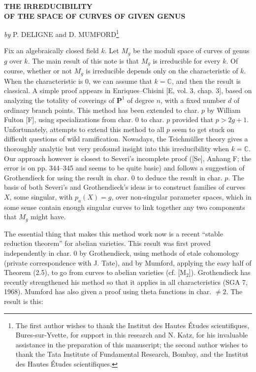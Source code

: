 \documentclass[10pt]{article}
\newcommand{\pa}{p_a}
\newcommand{\PP}{\mathbf P}
\begin{document}
\begin{center}
{\Large\bfseries THE IRREDUCIBILITY\\[0.3em]
OF THE SPACE OF CURVES OF GIVEN GENUS}\par
\vspace{0.8em}
{\itshape by} P. DELIGNE and D. MUMFORD\footnote{The first author wishes to thank the Institut des Hautes Études scientifiques, Bures-sur-Yvette, for support in this research and N. Katz, for his invaluable assistance in the preparation of this manuscript; the second author wishes to thank the Tata Institute of Fundamental Research, Bombay, and the Institut des Hautes Études scientifiques.}
\end{center}

Fix an algebraically closed field $k$. Let $M_g$ be the moduli space of curves of genus $g$ over $k$. The main result of this note is that $M_g$ is irreducible for every $k$. Of course, whether or not $M_g$ is irreducible depends only on the characteristic of $k$. When the characteristic is 0, we can assume that $k=\mathbb C$, and then the result is classical. A simple proof appears in Enriques--Chisini [E, vol. 3, chap. 3], based on analyzing the totality of coverings of $\PP^1$ of degree $n$, with a fixed number $d$ of ordinary branch points. This method has been extended to char. $p$ by William Fulton [F], using specializations from char. 0 to char. $p$ provided that $p>2g+1$. Unfortunately, attempts to extend this method to all $p$ seem to get stuck on difficult questions of wild ramification. Nowadays, the Teichmüller theory gives a thoroughly analytic but very profound insight into this irreducibility when $k=\mathbb C$. Our approach however is closest to Severi's incomplete proof ([Se], Anhang F; the error is on pp. 344--345 and seems to be quite basic) and follows a suggestion of Grothendieck for using the result in char. 0 to deduce the result in char. $p$. The basis of both Severi's and Grothendieck's ideas is to construct families of curves $X$, some singular, with $\pa(X)=g$, over non-singular parameter spaces, which in some sense contain enough singular curves to link together any two components that $M_g$ might have.

The essential thing that makes this method work now is a recent ``stable reduction theorem'' for abelian varieties. This result was first proved independently in char. 0 by Grothendieck, using methods of etale cohomology (private correspondence with J. Tate), and by Mumford, applying the easy half of Theorem (2.5), to go from curves to abelian varieties (cf. [M$_2$]). Grothendieck has recently strengthened his method so that it applies in all characteristics (SGA 7, 1968). Mumford has also given a proof using theta functions in char. $\ne 2$. The result is this:
\end{document}
